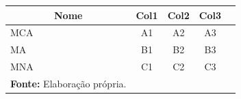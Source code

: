\begin{quadro}[H]
    \centering
    \caption{Exemplo de Quadro ABNTEx2}
    \label{quadro:cenarios}
    \begin{tabular}{lcccc}
        \hline
            \multicolumn{1}{c}{Nome} & Col1 & Col2 & Col3 \\
            \hline
        MCA & A1 & A2 & A3 \\
        MA  & B1 & B2 & B3 \\
        MNA & C1 & C2 & C3 \\
        \bottomrule
        \footnotesize{\textbf{Fonte:} Elaboração própria.}
    \end{tabular}
    \end{quadro}
        
    
